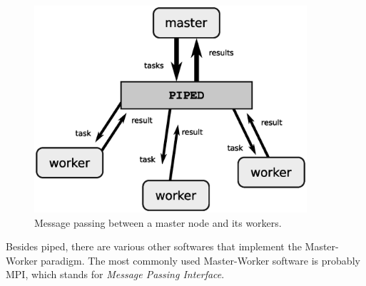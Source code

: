 \begin{figure}[htb]
  \centering
    \includegraphics[width=0.9\textwidth]{./../eps/piped.eps}
  \caption{Message passing between a master node and its workers.}
  \label{fig:piped}
\end{figure}



Besides piped, there are various other softwares that implement the Master-Worker paradigm. The most commonly used Master-Worker software is probably MPI, which stands for \textit{Message Passing Interface}. 
